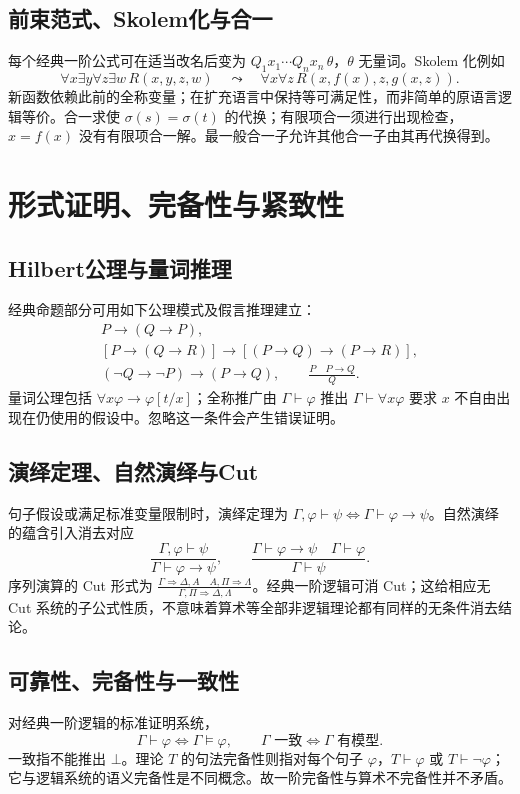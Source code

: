 \documentclass[../main.tex]{subfiles}
\begin{document}
\subsection{前束范式、Skolem化与合一}
每个经典一阶公式可在适当改名后变为 $Q_1x_1\cdots Q_nx_n\,\theta$，$\theta$ 无量词。Skolem 化例如
\[
\forall x\exists y\forall z\exists w\,R(x,y,z,w)
\quad\leadsto\quad\forall x\forall z\,R(x,f(x),z,g(x,z)).
\]
新函数依赖此前的全称变量；在扩充语言中保持等可满足性，而非简单的原语言逻辑等价。合一求使 $\sigma(s)=\sigma(t)$ 的代换；有限项合一须进行出现检查，$x=f(x)$ 没有有限项合一解。最一般合一子允许其他合一子由其再代换得到。
\section{形式证明、完备性与紧致性}
\subsection{Hilbert公理与量词推理}
经典命题部分可用如下公理模式及假言推理建立：
\begin{gather*}
P\to(Q\to P),\\
[P\to(Q\to R)]\to[(P\to Q)\to(P\to R)],\\
(\neg Q\to\neg P)\to(P\to Q),\qquad
\frac{P\quad P\to Q}{Q}.
\end{gather*}
量词公理包括 $\forall x\varphi\to\varphi[t/x]$；全称推广由 $\Gamma\vdash\varphi$ 推出 $\Gamma\vdash\forall x\varphi$ 要求 $x$ 不自由出现在仍使用的假设中。忽略这一条件会产生错误证明。
\subsection{演绎定理、自然演绎与Cut}
句子假设或满足标准变量限制时，演绎定理为 $\Gamma,\varphi\vdash\psi\iff\Gamma\vdash\varphi\to\psi$。自然演绎的蕴含引入消去对应
\[
\frac{\Gamma,\varphi\vdash\psi}{\Gamma\vdash\varphi\to\psi},\qquad
\frac{\Gamma\vdash\varphi\to\psi\quad\Gamma\vdash\varphi}{\Gamma\vdash\psi}.
\]
序列演算的 Cut 形式为 $\frac{\Gamma\Rightarrow\Delta,A\quad A,\Pi\Rightarrow\Lambda}{\Gamma,\Pi\Rightarrow\Delta,\Lambda}$。经典一阶逻辑可消 Cut；这给相应无 Cut 系统的子公式性质，不意味着算术等全部非逻辑理论都有同样的无条件消去结论。
\subsection{可靠性、完备性与一致性}
对经典一阶逻辑的标准证明系统，
\[
\Gamma\vdash\varphi\iff\Gamma\models\varphi,\qquad
\Gamma\text{ 一致}\iff\Gamma\text{ 有模型}.
\]
一致指不能推出 $\bot$。理论 $T$ 的句法完备性则指对每个句子 $\varphi$，$T\vdash\varphi$ 或 $T\vdash\neg\varphi$；它与逻辑系统的语义完备性是不同概念。故一阶完备性与算术不完备性并不矛盾。
\end{document}
